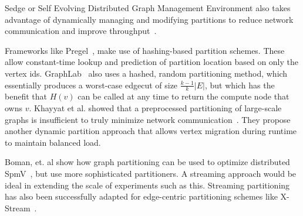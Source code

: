 Sedge or Self Evolving Distributed Graph Management Environment also takes advantage of dynamically managing and modifying partitions to reduce network communication and improve throughput~\cite{Yangpart}.

Frameworks like Pregel~\cite{Malpregel}, make use of hashing-based partition schemes.
These allow constant-time lookup and prediction of partition location based on only the vertex ids.
GraphLab~\cite{Low:2012:DGF:2212351.2212354} also uses a hashed, random partitioning method, which essentially produces a worst-case edgecut of size $\frac{k-1}{k}|E|$, but which has the benefit that $H(v)$ can be called at any time to return the compute node that owns $v$.  
Khayyat et al. showed that a preprocessed partitioning of large-scale graphs is insufficient to truly minimize network communication~\cite{khayyatmizan}.
They propose another dynamic partition approach that allows vertex migration during runtime to maintain balanced load.

Boman, et. al show how graph partitioning can be used to optimize distributed SpmV~\cite{Bomansc13}, but use more sophisticated partitioners. A streaming approach would be ideal in extending the scale of experiments such as this. 
Streaming partitioning has also been successfully adapted for edge-centric partitioning schemes like X-Stream~\cite{xstream}.

